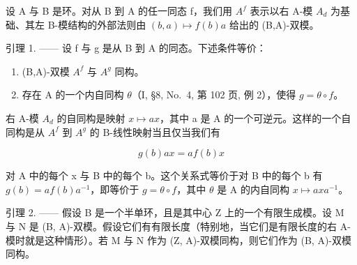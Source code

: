 设 A 与 B 是环。对从 B 到 A 的任一同态 f，我们用 \(A^{f}\) 表示以右 A-模 \(A_{d}\) 为基础、其左 B-模结构的外部法则由 \((b,a)\mapsto f(b)a\) 给出的 (B,A)-双模。

引理 1. —— 设 f 与 g 是从 B 到 A 的同态。下述条件等价：

\begin{enumerate}
\def\labelenumi{(\roman{enumi})}
\item
  (B,A)-双模 \(A^{f}\) 与 \(A^{g}\) 同构。
\item
  存在 A 的一个内自同构 \(\theta\)（I, §8, No.~4, 第 102 页, 例 2），使得 \(g = \theta \circ f\)。
\end{enumerate}

右 A-模 \(A_{d}\) 的自同构是映射 \(x \mapsto ax\)，其中 a 是 A 的一个可逆元。这样的一个自同构是从 \(A^{f}\) 到 \(A^{g}\) 的 B-线性映射当且仅当我们有

\[
g (b) a x = a f (b) x
\]

对 A 中的每个 x 与 B 中的每个 b。这个关系式等价于对 B 中的每个 b 有 \(g(b) = af(b)a^{-1}\)，即等价于 \(g = \theta \circ f\)，其中 \(\theta\) 是 A 的内自同构 \(x \mapsto axa^{-1}\)。

引理 2. —— 假设 B 是一个半单环，且是其中心 Z 上的一个有限生成模。设 M 与 N 是 (B, A)-双模。假设它们有有限长度（特别地，当它们是有限长度的右 A-模时就是这种情形）。若 M 与 N 作为 (Z, A)-双模同构，则它们作为 (B, A)-双模同构。

